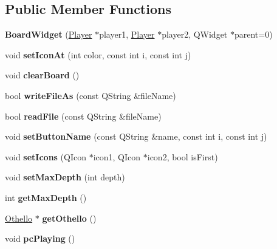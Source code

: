 \subsection*{Public Member Functions}
\begin{DoxyCompactItemize}
\item 
\hypertarget{classBoardWidget_a899075f0b7d687fdcfefcb717dfd0e9d}{
{\bfseries BoardWidget} (\hyperlink{classPlayer}{Player} $\ast$player1, \hyperlink{classPlayer}{Player} $\ast$player2, QWidget $\ast$parent=0)}
\label{classBoardWidget_a899075f0b7d687fdcfefcb717dfd0e9d}

\item 
\hypertarget{classBoardWidget_abc42f5611758699032fab658c01f756a}{
void {\bfseries setIconAt} (int color, const int i, const int j)}
\label{classBoardWidget_abc42f5611758699032fab658c01f756a}

\item 
\hypertarget{classBoardWidget_a62e0d2112c59b649a5093e71336c588d}{
void {\bfseries clearBoard} ()}
\label{classBoardWidget_a62e0d2112c59b649a5093e71336c588d}

\item 
\hypertarget{classBoardWidget_ac797e203ee2726958146401eaceae07c}{
bool {\bfseries writeFileAs} (const QString \&fileName)}
\label{classBoardWidget_ac797e203ee2726958146401eaceae07c}

\item 
\hypertarget{classBoardWidget_a34601e76b8af457faf66ba0600a7d381}{
bool {\bfseries readFile} (const QString \&fileName)}
\label{classBoardWidget_a34601e76b8af457faf66ba0600a7d381}

\item 
\hypertarget{classBoardWidget_a373e3f34859097cd54dec8084f1aef5e}{
void {\bfseries setButtonName} (const QString \&name, const int i, const int j)}
\label{classBoardWidget_a373e3f34859097cd54dec8084f1aef5e}

\item 
\hypertarget{classBoardWidget_af5592fde9ce389072bd62e52b588e6e6}{
void {\bfseries setIcons} (QIcon $\ast$icon1, QIcon $\ast$icon2, bool isFirst)}
\label{classBoardWidget_af5592fde9ce389072bd62e52b588e6e6}

\item 
\hypertarget{classBoardWidget_a95507d0e5853c3f0669bf766016e2d1a}{
void {\bfseries setMaxDepth} (int depth)}
\label{classBoardWidget_a95507d0e5853c3f0669bf766016e2d1a}

\item 
\hypertarget{classBoardWidget_abd289ae7b48829ed8f15fb22ec1cb038}{
int {\bfseries getMaxDepth} ()}
\label{classBoardWidget_abd289ae7b48829ed8f15fb22ec1cb038}

\item 
\hypertarget{classBoardWidget_a312d160230c801acc26c92bbe4b28b09}{
\hyperlink{classOthello}{Othello} $\ast$ {\bfseries getOthello} ()}
\label{classBoardWidget_a312d160230c801acc26c92bbe4b28b09}

\item 
\hypertarget{classBoardWidget_ae318d210d15bb959b5fe614b5680444d}{
void {\bfseries pcPlaying} ()}
\label{classBoardWidget_ae318d210d15bb959b5fe614b5680444d}

\end{DoxyCompactItemize}

